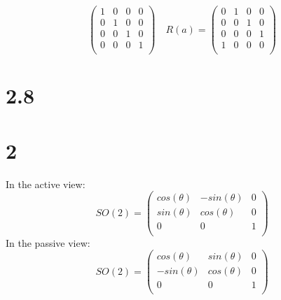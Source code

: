 \documentclass{article}
\begin{document}
\begin{CJK*}{GBK}{song}
\begin{equation}
\begin{pmatrix}
     1  &  0  &  0  &  0\\
     0  &  1  &  0  &  0\\
     0  &  0  &  1  &  0\\
     0  &  0  &  0  &  1\\
\end{pmatrix}\quad
R(a)=
\begin{pmatrix}
     0  &  1  &  0  &  0\\
     0  &  0  &  1  &  0\\
     0  &  0  &  0  &  1\\
     1  &  0  &  0  &  0\\
\end{pmatrix}
\end{equation}





\section{2.8}


\section{2}
In the active view:
\begin{equation}
SO(2)=
\begin{pmatrix}
     cos(\theta)  &  -sin(\theta)  &  0  \\
      sin(\theta)  &  cos(\theta)  &  0  \\
                    0  &                 0  &  1  \\
\end{pmatrix}
\end{equation}
In the passive view:
\begin{equation}
SO(2)=
\begin{pmatrix}
     cos(\theta)  &   sin(\theta)  &  0  \\
     -sin(\theta)  &  cos(\theta)  &  0  \\
                    0  &                 0  &  1  \\
\end{pmatrix}
\end{equation}































\end{CJK*}
\end{document}

